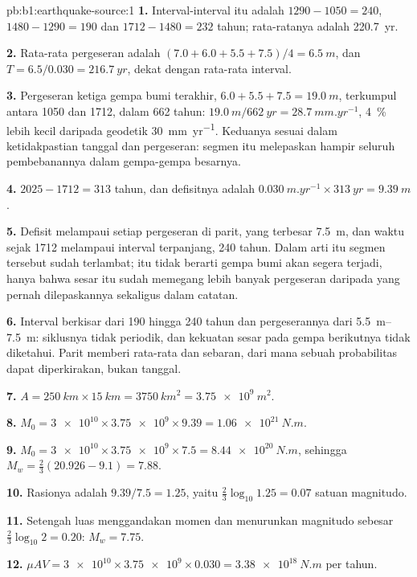 \begin{solution}{pb:b1:earthquake-source:1}
\textbf{1.} Interval-interval itu adalah $1290 - 1050 = 240$, $1480 - 1290 = 190$ dan
$1712 - 1480 = 232$ tahun; rata-ratanya adalah \qty{220.7}{yr}.

\textbf{2.} Rata-rata pergeseran adalah $(7.0 + 6.0 + 5.5 + 7.5)/4 = \qty{6.5}{m}$, dan
$T = 6.5/0.030 = \qty{216.7}{yr}$, dekat dengan rata-rata interval.

\textbf{3.} Pergeseran ketiga gempa bumi terakhir, $6.0 + 5.5 + 7.5 =
\qty{19.0}{m}$, terkumpul antara 1050 dan 1712, dalam 662 tahun: $\qty{19.0}{m}
/\qty{662}{yr} = \qty{28.7}{mm.yr^{-1}}$, \qty{4}{\percent} lebih kecil daripada
geodetik \qty{30}{mm.yr^{-1}}. Keduanya sesuai dalam ketidakpastian tanggal dan pergeseran: segmen itu melepaskan hampir seluruh pembebanannya dalam gempa-gempa besarnya.

\textbf{4.} $2025 - 1712 = 313$ tahun, dan defisitnya adalah
$\qty{0.030}{m.yr^{-1}}\times\qty{313}{yr} = \qty{9.39}{m}$.

\textbf{5.} Defisit melampaui setiap pergeseran di parit, yang terbesar \qty{7.5}{m}, dan waktu sejak 1712 melampaui interval terpanjang, 240 tahun. Dalam arti itu segmen tersebut sudah terlambat; itu tidak berarti gempa bumi akan segera terjadi, hanya bahwa sesar itu sudah memegang lebih banyak pergeseran daripada yang pernah dilepaskannya sekaligus dalam catatan.

\textbf{6.} Interval berkisar dari 190 hingga 240 tahun dan pergeserannya dari \qtyrange{5.5}{7.5}{m}: siklusnya tidak periodik, dan kekuatan sesar pada gempa berikutnya tidak diketahui. Parit memberi rata-rata dan sebaran, dari mana sebuah probabilitas dapat diperkirakan, bukan tanggal.

\textbf{7.} $A = \qty{250}{km}\times\qty{15}{km} = \qty{3750}{km^2} =
\qty{3.75e9}{m^2}$.

\textbf{8.} $M_0 = \num{3e10}\times\num{3.75e9}\times\num{9.39} =
\qty{1.06e21}{N.m}$.

\textbf{9.} $M_0 = \num{3e10}\times\num{3.75e9}\times\num{7.5} =
\qty{8.44e20}{N.m}$, sehingga $M_w = \tfrac23(20.926 - 9.1) = 7.88$.

\textbf{10.} Rasionya adalah $9.39/7.5 = 1.25$, yaitu $\tfrac23\log_{10}1.25 =
0.07$ satuan magnitudo.

\textbf{11.} Setengah luas menggandakan momen dan menurunkan magnitudo sebesar
$\tfrac23\log_{10}2 = 0.20$: $M_w = 7.75$.

\textbf{12.} $\mu A V = \num{3e10}\times\num{3.75e9}\times\num{0.030} =
\qty{3.38e18}{N.m}$ per tahun.


\end{solution}
